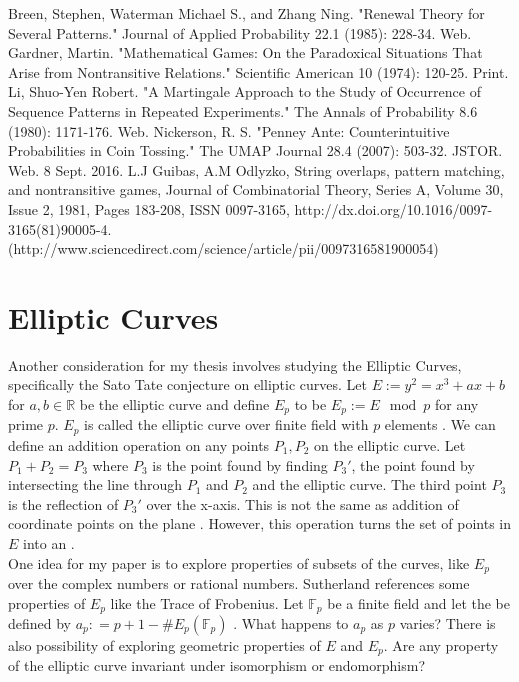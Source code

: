 \documentclass{article}
\numberwithin{mytheorem}{subsection} %
\begin{document}
	\begin{thebibliography}{1}
			Breen, Stephen, Waterman Michael S., and Zhang Ning. "Renewal Theory for Several Patterns." Journal of Applied Probability 22.1 (1985): 228-34. Web.
			Gardner, Martin. "Mathematical Games: On the Paradoxical Situations That Arise from Nontransitive Relations." Scientific American 10 (1974): 120-25. Print.
			Li, Shuo-Yen Robert. "A Martingale Approach to the Study of Occurrence of Sequence Patterns in Repeated Experiments." The Annals of Probability 8.6 (1980): 1171-176. Web.
			Nickerson, R. S. "Penney Ante: Counterintuitive Probabilities in Coin Tossing." The UMAP Journal 28.4 (2007): 503-32. JSTOR. Web. 8 Sept. 2016. 
			L.J Guibas, A.M Odlyzko, String overlaps, pattern matching, and nontransitive games, Journal of Combinatorial Theory, Series A, Volume 30, Issue 2, 1981, Pages 183-208, ISSN 0097-3165, http://dx.doi.org/10.1016/0097-3165(81)90005-4.
			(http://www.sciencedirect.com/science/article/pii/0097316581900054)	

	\end{thebibliography}

	\section{Elliptic Curves}
		Another consideration for my thesis involves studying the Elliptic Curves, specifically the Sato Tate conjecture on elliptic curves. Let $E := y^2 = x^3 + ax + b$ for $a, b \in \mathbb{R}$ be the elliptic curve and define $E_p$ to be $E_p:= E \mod p$ for any prime $p$. $E_p$ is called the elliptic curve over finite field with $p$ elements \cite{sutherland}. We can define an addition operation on any points $P_1, P_2$ on the elliptic curve. Let $P_1 + P_2 = P_3$ where $P_3$ is the point found by finding $P_3'$, the point found by intersecting the line through $P_1$ and $P_2$ and the elliptic curve. The third point $P_3$ is the reflection of $P_3'$ over the x-axis. This is not the same as addition of coordinate points on the plane \cite{thebasictheory}. However, this operation turns the set of points in $E$ into an  \cite{thebasictheory}. \\

		One idea for my paper is to explore properties of subsets of the curves, like $E_p$ over the complex numbers or rational numbers. Sutherland references some properties of $E_p$ like the Trace of Frobenius. Let $\mathbb{F}_p$ be a finite field and let the  be defined by $a_p : = p + 1 - \#E_p(\mathbb{F}_p)$ \cite{sutherland}. What happens to $a_p$ as $p$ varies? There is also possibility of exploring geometric properties of $E$ and $E_p$. Are any property of the elliptic curve invariant under isomorphism or endomorphism?
\end{document}
